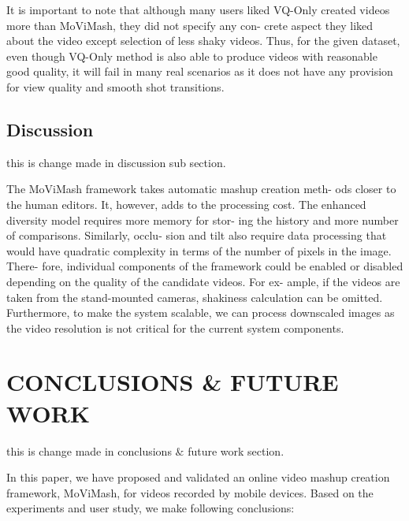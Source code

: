 \documentclass{new}
\begin{document}
It is important to note that although many users liked VQ-Only
created videos more than MoViMash, they did not specify any con-
crete aspect they liked about the video except selection of less
shaky videos. Thus, for the given dataset, even though VQ-Only
method is also able to produce videos with reasonable good quality,
it will fail in many real scenarios as it does not have any provision
for view quality and smooth shot transitions.

\subsection{Discussion}
this is change made in discussion sub section.

The MoViMash framework takes automatic mashup creation meth-
ods closer to the human editors. It, however, adds to the processing
cost. The enhanced diversity model requires more memory for stor-
ing the history and more number of comparisons. Similarly, occlu-
sion and tilt also require data processing that would have quadratic
complexity in terms of the number of pixels in the image. There-
fore, individual components of the framework could be enabled or
disabled depending on the quality of the candidate videos. For ex-
ample, if the videos are taken from the stand-mounted cameras,
shakiness calculation can be omitted. Furthermore, to make the
system scalable, we can process downscaled images as the video
resolution is not critical for the current system components.

\section{CONCLUSIONS \& FUTURE WORK}
this is change made in conclusions $\&$ future work section.

In this paper, we have proposed and validated an online video
mashup creation framework, MoViMash, for videos recorded by
mobile devices. Based on the experiments and user study, we make
following conclusions:
\end{document}
